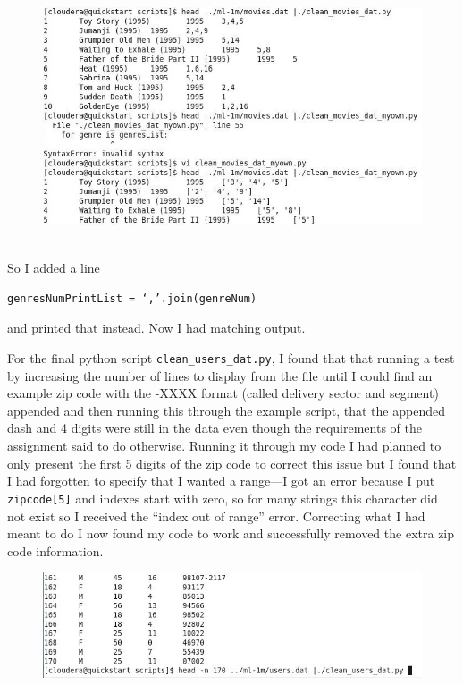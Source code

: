 \documentclass[10pt]{article}
\begin{document}
\begin{figure}[!h]
\includegraphics[scale=0.37]{clean_movies_error1.jpg}
\centering
\end{figure}\\
So I added a line 
\begin{verbatim}genresNumPrintList = ‘,’.join(genreNum)\end{verbatim}
and printed that instead. Now I had matching output.
\par For the final python script \verb|clean_users_dat.py|, I found that that running a test by increasing the number of lines to display from the file until I could find an example zip code with the -XXXX format (called delivery sector and segment) appended and then running this through the example script, that the appended dash and 4 digits were still in the data even though the requirements of the assignment said to do otherwise. Running it through my code I had planned to only present the first 5 digits of the zip code to correct this issue but I found that I had forgotten to specify that I wanted a range—I got an error because I put \verb|zipcode[5]| and indexes start with zero, so for many strings this character did not exist so I received the “index out of range” error. Correcting what I had meant to do I now found my code to work and successfully removed the extra zip code information.
\begin{figure}[!h]
\includegraphics[scale=0.5]{broken_users_example.jpg}
\centering
\end{figure}
\end{document}
